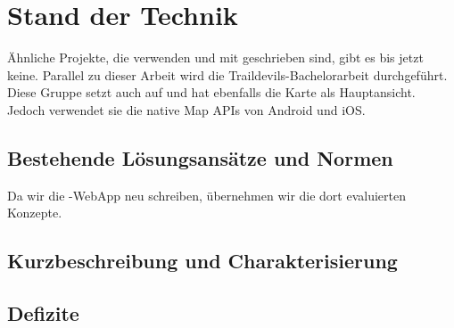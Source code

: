 \chapter{Stand der Technik}
\label{tb-stand-der-technik}
Ähnliche Projekte, die  verwenden und mit  geschrieben sind, gibt es bis jetzt keine.
Parallel zu dieser Arbeit wird die Traildevils-Bachelorarbeit durchgeführt.
Diese Gruppe setzt auch auf  und hat ebenfalls die Karte als Hauptansicht.
Jedoch verwendet sie die native Map APIs von Android und iOS.


\section{Bestehende Lösungsansätze und Normen}
Da wir die \kort{}-\gls{WebApp} neu schreiben, übernehmen wir die dort evaluierten Konzepte.


\section{Kurzbeschreibung und Charakterisierung}


\section{Defizite}

